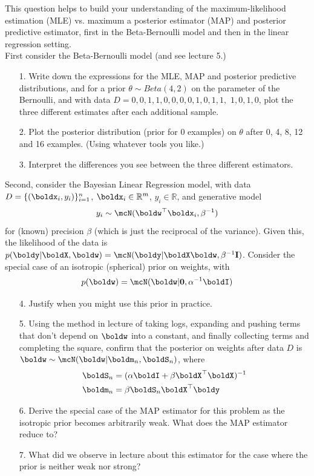 \documentclass[submit]{harvardml}
\begin{document}
\newpage
\begin{problem}

  This question helps to build your understanding of the
  maximum-likelihood estimation (MLE) vs. maximum a posterior estimator
  (MAP) and posterior predictive estimator, first in the
  Beta-Bernoulli model and then in the linear regression setting.\\

First consider the Beta-Bernoulli model (and see lecture 5.) 
%
\begin{enumerate}
\item[1.] Write down the expressions for the MLE, MAP and posterior predictive
distributions, and for
a prior $\theta\sim Beta(4,2)$ on the
parameter of the Bernoulli,
and  with data $D= 0, 0, 1, 1, 0, 0, 0, 0, 1, 0, 1, 1,$ 
$1, 0, 1, 0$, plot 
the three different
estimates after each additional
sample.
%
\item[2.] Plot the posterior distribution (prior for 0 examples) on $\theta$ after 0, 4, 8, 12 and 16
examples. (Using whatever tools you like.)
%
\item[3.] Interpret the differences you see between the three different
estimators.
%
%
\end{enumerate}

Second, consider the Bayesian Linear Regression model, with
data $D=\{(\boldx_i,y_i)\}_{i=1}^n$, $\boldx_i\in\mathbb{R}^m$,
 $y_i\in\mathbb{R}$, and generative model 
%
$$
y_i\sim\mcN(\boldw^\top\boldx_i,\beta^{-1})
$$
for (known) precision $\beta$ (which is just the reciprocal
of the variance). Given this, the likelihood of the
data is $p(\boldy|\boldX,\boldw) = \mcN(\boldy|\boldX\boldw,\beta^{-1}\mathbf{I})$. Consider the special case of 
an isotropic (spherical) prior on weights, with
%
$$
p(\boldw)=\mcN(\boldw|\bold0,\alpha^{-1}\boldI)
$$

\begin{enumerate}
\item[4.] Justify when you might use this prior in practice.
%
\item[5.] Using the method in lecture of taking logs, expanding and pushing terms
that don't depend on $\boldw$ into a constant, and finally collecting
terms and completing the square, confirm that the posterior on
weights after data $D$ is $\boldw\sim\mcN(\boldw|\boldm_n,\boldS_n)$,
where
%
\begin{align*}
\boldS_n&=(\alpha\boldI+\beta\boldX^\top\boldX)^{-1}\\
\boldm_n&=\beta\boldS_n\boldX^\top\boldy
\end{align*}
\item[6.] Derive the special case
of the MAP estimator for this problem as the isotropic
prior becomes arbitrarily weak.
What does the MAP estimator reduce to?
%
\item[7.] What did we observe in lecture about this
estimator for the case where 
the prior is neither weak nor strong?
\end{enumerate}
\end{problem}
\end{document}

